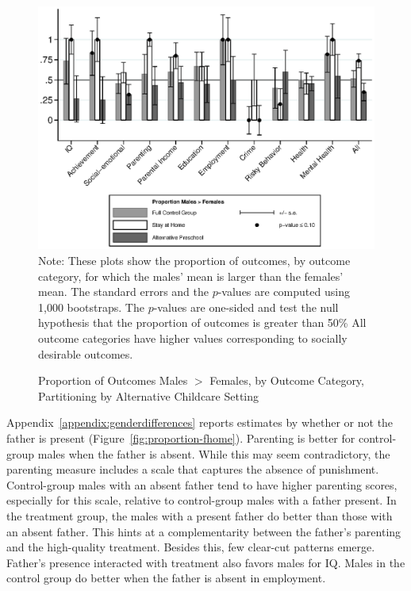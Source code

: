 \begin{figure}[H]
\centering
\caption{Proportion of Outcomes Males $>$ Females, by Outcome Category, Partitioning by Alternative Childcare Setting}
\label{fig:proportion-altpre}
	\includegraphics[width=\textwidth]{output/gendergaps-control-moderated-altpre}
\footnotesize \justify
Note: These plots show the proportion of outcomes, by outcome category, for which the males' mean is larger than the females' mean. The standard errors and the $p$-values are computed using 1,000 bootstraps. The $p$-values are one-sided and test the null hypothesis that the proportion of outcomes is greater than 50\% All outcome categories have higher values corresponding to socially desirable outcomes.
\end{figure}

Appendix~\ref{appendix:genderdifferences} reports estimates by whether or not the father is present (Figure~\ref{fig:proportion-fhome}). Parenting is better for control-group males when the father is absent. While this may seem contradictory, the parenting measure includes a scale that captures the absence of punishment. Control-group males with an absent father tend to have higher parenting scores, especially for this scale, relative to control-group males with a father present. In the treatment group, the males with a present father do better than those with an absent father. This hints at a complementarity between the father's parenting and the high-quality treatment. Besides this, few clear-cut patterns emerge. Father's presence interacted with treatment also favors males for IQ. Males in the control group do better when the father is absent in employment.

